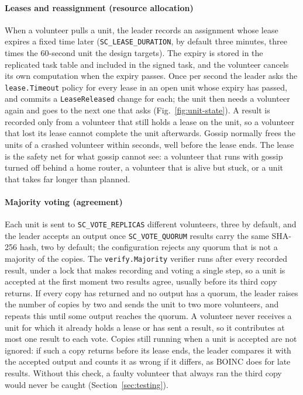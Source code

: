\paragraph{Leases and reassignment (resource allocation)} When a volunteer pulls a unit, the leader records an assignment whose lease expires a fixed time later (\texttt{SC\_LEASE\_DURATION}, by default three minutes, three times the 60-second unit the design targets). The expiry is stored in the replicated task table and included in the signed task, and the volunteer cancels its own computation when the expiry passes. Once per second the leader asks the \texttt{lease.Timeout} policy for every lease in an open unit whose expiry has passed, and commits a \texttt{LeaseReleased} change for each; the unit then needs a volunteer again and goes to the next one that asks (Fig.~\ref{fig:unit-state}). A result is recorded only from a volunteer that still holds a lease on the unit, so a volunteer that lost its lease cannot complete the unit afterwards. Gossip normally frees the units of a crashed volunteer within seconds, well before the lease ends. The lease is the safety net for what gossip cannot see: a volunteer that runs with gossip turned off behind a home router, a volunteer that is alive but stuck, or a unit that takes far longer than planned.

\paragraph{Majority voting (agreement)} Each unit is sent to \texttt{SC\_VOTE\_REPLICAS} different volunteers, three by default, and the leader accepts an output once \texttt{SC\_VOTE\_QUORUM} results carry the same SHA-256 hash, two by default; the configuration rejects any quorum that is not a majority of the copies. The \texttt{verify.Majority} verifier runs after every recorded result, under a lock that makes recording and voting a single step, so a unit is accepted at the first moment two results agree, usually before its third copy returns. If every copy has returned and no output has a quorum, the leader raises the number of copies by two and sends the unit to two more volunteers, and repeats this until some output reaches the quorum. A volunteer never receives a unit for which it already holds a lease or has sent a result, so it contributes at most one result to each vote. Copies still running when a unit is accepted are not ignored: if such a copy returns before its lease ends, the leader compares it with the accepted output and counts it as wrong if it differs, as BOINC does for late results. Without this check, a faulty volunteer that always ran the third copy would never be caught (Section~\ref{sec:testing}).


